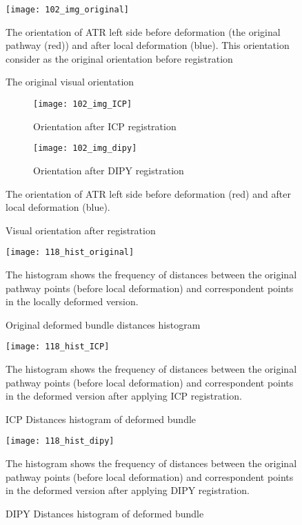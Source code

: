 \documentclass[../structure.tex]{subfiles}
\begin{document}
\begin{figure}[H]
\centering
\texttt{[image: 102\_img\_original]}
\captionsetup{justification=centering}
\caption{The original visual orientation}%
{The orientation of ATR left side before deformation (the original pathway (red)) and after local deformation (blue). This orientation consider as the original orientation before registration}
\label{fig:img_original_def}
\end{figure}

\begin{figure}[H]
	\centering
	\begin{subfigure}[b]{0.49\textwidth}
	\centering
	\texttt{[image: 102\_img\_ICP]}
	\caption{Orientation after ICP registration}
	\end{subfigure}
	\begin{subfigure}[b]{0.49\textwidth}
	\centering
	\texttt{[image: 102\_img\_dipy]}
	\caption{Orientation after DIPY registration}
	\end{subfigure}
\captionsetup{justification=centering}
\caption{Visual orientation after registration}
{The orientation of ATR left side before deformation (red) and after local deformation (blue).}
\label{fig:registration3}
\end{figure}

\begin{figure}[H]
\centering
\texttt{[image: 118\_hist\_original]}
\captionsetup{justification=centering}
\caption{Original deformed bundle distances histogram}
{The histogram shows the frequency of distances between the original pathway points (before local deformation) and correspondent points in the locally deformed version.}
\label{fig:hist_original_def}
\end{figure}

\begin{figure}[H]
\centering
\texttt{[image: 118\_hist\_ICP]}
\captionsetup{justification=centering}
\caption{ICP Distances histogram of deformed bundle}
{The histogram shows the frequency of distances between the original pathway points (before local deformation) and correspondent points in the deformed version after applying ICP registration.}
\label{fig:hist_icp_def}
\end{figure}

\begin{figure}[H]
\centering
\texttt{[image: 118\_hist\_dipy]}
\captionsetup{justification=centering}
\caption{DIPY Distances histogram of deformed bundle}
{The histogram shows the frequency of distances between the original pathway points (before local deformation) and correspondent points in the deformed version after applying DIPY registration.}
\label{fig:hist_dipy_def}
\end{figure}
\end{document}

